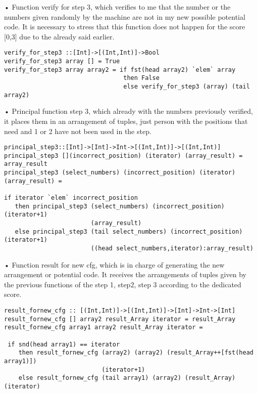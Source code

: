 \documentclass[12pt,letterpaper]{article}
\begin{document}
\begin{raggedleft}
• Function verify for step 3, which verifies to me that the number or the numbers given randomly by the machine are not in my new possible potential code. It is necessary to stress that this function does not happen for the score [0,3] due to the already said earlier.
\end{raggedleft}
\begin{verbatim}
verify_for_step3 ::[Int]->[(Int,Int)]->Bool
verify_for_step3 array [] = True                                              
verify_for_step3 array array2 = if fst(head array2) `elem` array
                                 then False                               
                                 else verify_for_step3 (array) (tail array2)    
\end{verbatim}

\begin{raggedleft}
• Principal function step 3, which already with the numbers previously verified, it places them in an arrangement of tuples, just person with the positions that need and 1 or 2 have not been used in the step.
\end{raggedleft}
\begin{verbatim}
principal_step3::[Int]->[Int]->Int->[(Int,Int)]->[(Int,Int)]
principal_step3 [](incorrect_position) (iterator) (array_result) = array_result
principal_step3 (select_numbers) (incorrect_position) (iterator) (array_result) = 

if iterator `elem` incorrect_position
   then principal_step3 (select_numbers) (incorrect_position) (iterator+1)
                        (array_result)
   else principal_step3 (tail select_numbers) (incorrect_position) (iterator+1)
                        ((head select_numbers,iterator):array_result)
\end{verbatim}

\begin{raggedleft}
• Function result for new cfg, which is in charge of generating the new arrangement or potential code. It receives the arrangements of tuples given by the previous functions of the step 1, step2, step 3 according to the dedicated score.
\end{raggedleft}
\begin{verbatim}
result_fornew_cfg :: [(Int,Int)]->[(Int,Int)]->[Int]->Int->[Int]
result_fornew_cfg [] array2 result_Array iterator = result_Array 
result_fornew_cfg array1 array2 result_Array iterator =

 if snd(head array1) == iterator
    then result_fornew_cfg (array2) (array2) (result_Array++[fst(head array1)])
                           (iterator+1)
    else result_fornew_cfg (tail array1) (array2) (result_Array) (iterator)
\end{verbatim}
\end{document}
